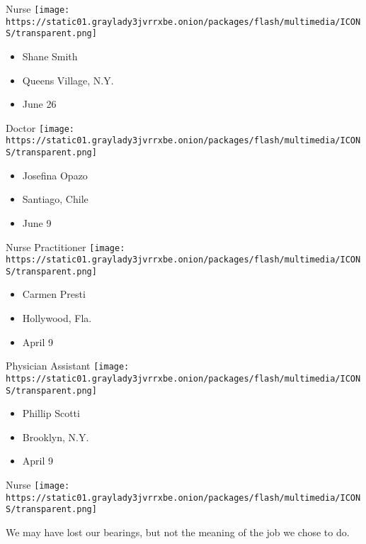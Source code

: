 \protect\hyperlink{item-shane-smith}{}

Nurse
\texttt{[image: https://static01.graylady3jvrrxbe.onion/packages/flash/multimedia/ICONS/transparent.png]}

\begin{itemize}
\tightlist
\item
  Shane Smith
\item
  Queens Village, N.Y.
\item
  June 26
\end{itemize}

\protect\hyperlink{item-josefina-opazo}{}

Doctor
\texttt{[image: https://static01.graylady3jvrrxbe.onion/packages/flash/multimedia/ICONS/transparent.png]}

\begin{itemize}
\tightlist
\item
  Josefina Opazo
\item
  Santiago, Chile
\item
  June 9
\end{itemize}

\protect\hyperlink{item-carmen-presti}{}

Nurse Practitioner
\texttt{[image: https://static01.graylady3jvrrxbe.onion/packages/flash/multimedia/ICONS/transparent.png]}

\begin{itemize}
\tightlist
\item
  Carmen Presti
\item
  Hollywood, Fla.
\item
  April 9
\end{itemize}

\protect\hyperlink{item-phillip-scotti}{}

Physician Assistant
\texttt{[image: https://static01.graylady3jvrrxbe.onion/packages/flash/multimedia/ICONS/transparent.png]}

\begin{itemize}
\tightlist
\item
  Phillip Scotti
\item
  Brooklyn, N.Y.
\item
  April 9
\end{itemize}

\protect\hyperlink{item-marion-levigne}{}

Nurse
\texttt{[image: https://static01.graylady3jvrrxbe.onion/packages/flash/multimedia/ICONS/transparent.png]}

We may have lost our bearings, but not the meaning of the job we chose
to do.

